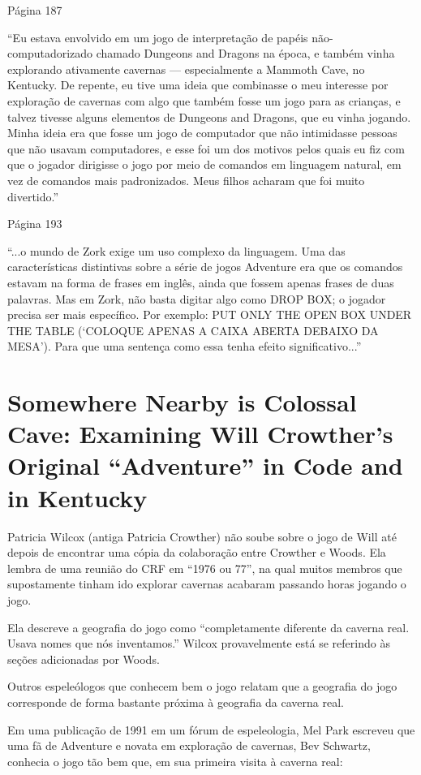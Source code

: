\documentclass[12pt,a4paper]{article}
\begin{document}
Página 187

“Eu estava envolvido em um jogo de interpretação de papéis não-computadorizado chamado Dungeons and Dragons na época, e também vinha explorando ativamente cavernas — especialmente a Mammoth Cave, no Kentucky. De repente, eu tive uma ideia que combinasse o meu interesse por exploração de cavernas com algo que também fosse um jogo para as crianças, e talvez tivesse alguns elementos de Dungeons and Dragons, que eu vinha jogando. Minha ideia era que fosse um jogo de computador que não intimidasse pessoas que não usavam computadores, e esse foi um dos motivos pelos quais eu fiz com que o jogador dirigisse o jogo por meio de comandos em linguagem natural, em vez de comandos mais padronizados.
Meus filhos acharam que foi muito divertido.”

Página 193

“...o mundo de Zork exige um uso complexo da linguagem.
Uma das características distintivas sobre a série de jogos Adventure era que os comandos estavam na forma de frases em inglês, ainda que fossem apenas frases de duas palavras.
Mas em Zork, não basta digitar algo como DROP BOX; o jogador precisa ser mais específico.
Por exemplo: PUT ONLY THE OPEN BOX UNDER THE TABLE (‘COLOQUE APENAS A CAIXA ABERTA DEBAIXO DA MESA’).
Para que uma sentença como essa tenha efeito significativo...”

\section{Somewhere Nearby is Colossal Cave: Examining Will Crowther's Original “Adventure” in Code and in Kentucky}

Patricia Wilcox (antiga Patricia Crowther) não soube sobre o jogo de Will até depois de encontrar uma cópia da colaboração entre Crowther e Woods.
Ela lembra de uma reunião do CRF em “1976 ou 77”, na qual muitos membros que supostamente tinham ido explorar cavernas acabaram passando horas jogando o jogo.

Ela descreve a geografia do jogo como “completamente diferente da caverna real. Usava nomes que nós inventamos.”
Wilcox provavelmente está se referindo às seções adicionadas por Woods.

Outros espeleólogos que conhecem bem o jogo relatam que a geografia do jogo corresponde de forma bastante próxima à geografia da caverna real.

Em uma publicação de 1991 em um fórum de espeleologia, Mel Park escreveu que uma fã de Adventure e novata em exploração de cavernas, Bev Schwartz, conhecia o jogo tão bem que, em sua primeira visita à caverna real:
\end{document}
